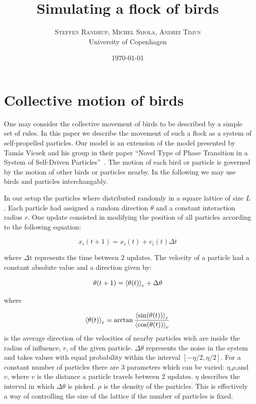 \documentclass[twoside,twocolumn]{article}
\title{Simulating a flock of birds} %
\author{%
\textsc{Steffen Randrup, Michel Smola, Andrei Timus}\\[1ex] %
\normalsize University of Copenhagen \\ %
}
\date{\today} %
\begin{document}
\maketitle


\section{Collective motion of birds}

One may consider the collective movement of birds to be described by a simple set of rules.
In this paper we describe the movement of such a flock as a system of self-propelled particles.
Our model is an extension of the model presented by Tamás Vicsek and his group in their paper ``Novel Type of Phase Transition in a System of Self-Driven Particles''~\cite{Vicsek}.
The motion of each bird or particle is governed by the motion of other birds or particles nearby.
In the following we may use birds and particles interchangably.

In our setup the particles where distributed randomly in a square lattice of size $L$.
Each particle had assigned a random direction $\theta$ and a constant interaction radius $r$.
One update consisted in modifying the position of all particles according to the following equation:

\begin{equation}
x_{i}(t+1)=x_i(t)+v_i(t)\Delta t
\end{equation}

where $\Delta$t represents the time between 2 updates.
The velocity of a particle had a constant absolute value and a direction given by:

\begin{equation}
\theta(t+1)=\braket{\theta(t)}_r+\Delta \theta
\end{equation} 

where 

\begin{equation}
  \braket{\theta(t)}_r=\arctan\frac{\braket{\sin(\theta(t))}_r}{\braket{\cos(\theta(t))}_r}
\end{equation}
%
is the average direction of the velocities of nearby particles wich are inside the radius of influence, $r$, of the given particle.
$\Delta \theta$ represents the noise in the system and takes values with equal probability within the interval $[-\eta/2,\eta/2]$.
For a constant number of particles there are 3 parameters which can be varied: $\eta$,$\rho$,and $v$,
where $v$ is the distance a particle travels between 2 updates.
$\eta$ describes the interval in which $\Delta\theta$ is picked. $\rho$ is the density of the particles.
This is effectively a way of controlling the size of the lattice if the number of particles is fixed.
\end{document}
